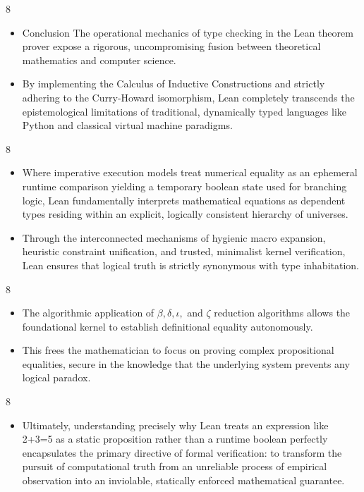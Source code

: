 \documentclass[10pt]{beamer}
\begin{document}
\begin{frame}{8}
\begin{itemize}\setlength{\itemsep}{1.5em}
  \item Conclusion The operational mechanics of type checking in the Lean theorem prover expose a rigorous, uncompromising fusion between theoretical mathematics and computer science.
  \item By implementing the Calculus of Inductive Constructions and strictly adhering to the Curry-Howard isomorphism, Lean completely transcends the epistemological limitations of traditional, dynamically typed languages like Python and classical virtual machine paradigms.
\end{itemize}
\end{frame}

\begin{frame}{8}
\begin{itemize}\setlength{\itemsep}{1.5em}
  \item Where imperative execution models treat numerical equality as an ephemeral runtime comparison yielding a temporary boolean state used for branching logic, Lean fundamentally interprets mathematical equations as dependent types residing within an explicit, logically consistent hierarchy of universes.
  \item Through the interconnected mechanisms of hygienic macro expansion, heuristic constraint unification, and trusted, minimalist kernel verification, Lean ensures that logical truth is strictly synonymous with type inhabitation.
\end{itemize}
\end{frame}

\begin{frame}{8}
\begin{itemize}\setlength{\itemsep}{1.5em}
  \item The algorithmic application of $\beta, \delta, \iota,$ and $\zeta$ reduction algorithms allows the foundational kernel to establish definitional equality autonomously.
  \item This frees the mathematician to focus on proving complex propositional equalities, secure in the knowledge that the underlying system prevents any logical paradox.
\end{itemize}
\end{frame}

\begin{frame}{8}
\begin{itemize}\setlength{\itemsep}{1.5em}
  \item Ultimately, understanding precisely why Lean treats an expression like 2+3=5 as a static proposition rather than a runtime boolean perfectly encapsulates the primary directive of formal verification: to transform the pursuit of computational truth from an unreliable process of empirical observation into an inviolable, statically enforced mathematical guarantee.
\end{itemize}
\end{frame}
\end{document}
